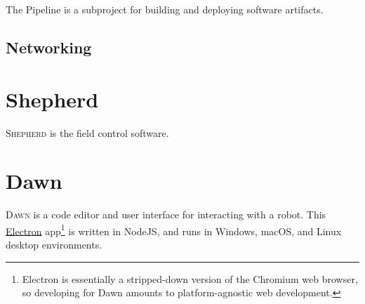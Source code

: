 \documentclass[12pt]{book}
\begin{document}
  The Pipeline is a subproject for building and deploying software artifacts.

  \section{Networking}

  \chapter{Shepherd}

  \textsc{Shepherd} is the field control software.

  \chapter{Dawn}

  \textsc{Dawn} is a code editor and user interface for interacting with a robot.
  This \href{https://electronjs.org/}{Electron} app\footnote{Electron is essentially a stripped-down version of the Chromium web browser, so developing for Dawn amounts to platform-agnostic web development.} is written in NodeJS, and runs in Windows, macOS, and Linux desktop environments.

  \printglossaries
  \glsaddall
\end{document}
